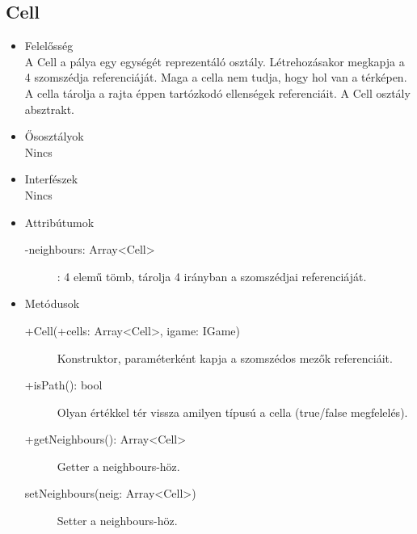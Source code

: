 \subsection{Cell}
\begin{itemize}
\item Felelősség\\
A Cell a pálya egy egységét reprezentáló osztály. Létrehozásakor megkapja a 4 szomszédja referenciáját. Maga a cella nem tudja, hogy hol van a térképen. A cella tárolja a rajta éppen tartózkodó ellenségek referenciáit. A Cell osztály absztrakt.
\item Ősosztályok\\
Nincs
\item Interfészek\\
Nincs
\item Attribútumok
	\begin{description}
		\item[-neighbours: Array<Cell>]: 4 elemű tömb, tárolja 4 irányban a szomszédjai referenciáját.  
		

		
	\end{description}
\item Metódusok
	\begin{description}
		
		\item[+Cell(+cells: Array<Cell>, igame: IGame)] Konstruktor, paraméterként kapja a szomszédos mezők referenciáit. 
		\item[+isPath(): bool] Olyan értékkel tér vissza amilyen típusú a cella (true/false megfelelés). 
		\item[+getNeighbours(): Array<Cell>] Getter a neighbours-höz.
		\item[setNeighbours(neig: Array<Cell>)] Setter a neighbours-höz.
		
		
	\end{description}
\end{itemize}

